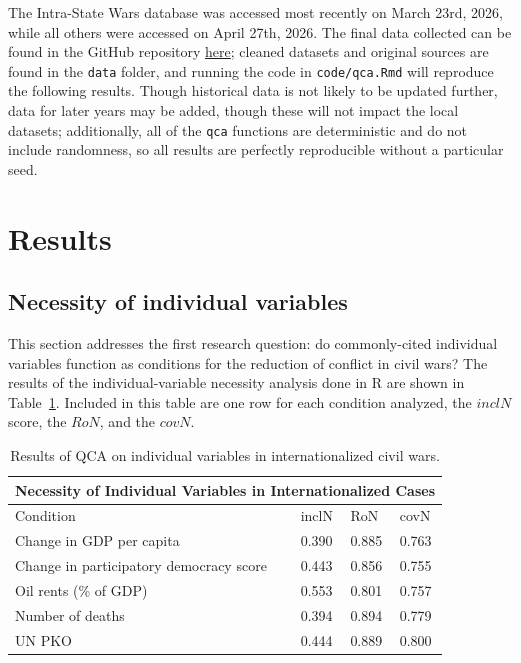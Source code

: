 \documentclass{article}
\begin{document}
The Intra-State Wars database was accessed most recently on March 23rd, 2026, while all others were accessed on April 27th, 2026. The final data collected can be found in the GitHub repository \href{https://github.com/GW-datasci/26-spring-LUTZ-H}{here}; cleaned datasets and original sources are found in the \texttt{data} folder, and running the code in \texttt{code/qca.Rmd} will reproduce the following results. Though historical data is not likely to be updated further, data for later years may be added, though these will not impact the local datasets; additionally, all of the \texttt{qca} functions are deterministic and do not include randomness, so all results are perfectly reproducible without a particular seed. 

\section{Results}
\subsection{Necessity of individual variables}
This section addresses the first research question: do commonly-cited individual variables function as conditions for the reduction of conflict in civil wars? The results of the individual-variable necessity analysis done in R are shown in Table~\ref{tab:necessity-results}. Included in this table are one row for each condition analyzed, the $inclN$ score, the $RoN$, and the $covN$.

\begin{table}[ht]
    \centering
    \small
    \begin{tabular}{p{3cm} p{1.5cm} p{1.5cm} p{1.5cm}}
        \hline
        \multicolumn{4}{c}{Necessity of Individual Variables in Internationalized Cases} \\
        \hline
        Condition & inclN & RoN & covN \\
        \hline
        Change in GDP per capita & 0.390 & 0.885 & 0.763 \\
        Change in participatory democracy score & 0.443 & 0.856 & 0.755 \\
        Oil rents (\% of GDP) & 0.553 & 0.801 & 0.757 \\
        Number of deaths & 0.394 & 0.894 & 0.779 \\
        UN PKO & 0.444 & 0.889 & 0.800 \\
        \hline
    \end{tabular}
    \caption{Results of QCA on individual variables in internationalized civil wars.}
    \label{tab:necessity-results}
\end{table}
\end{document}
